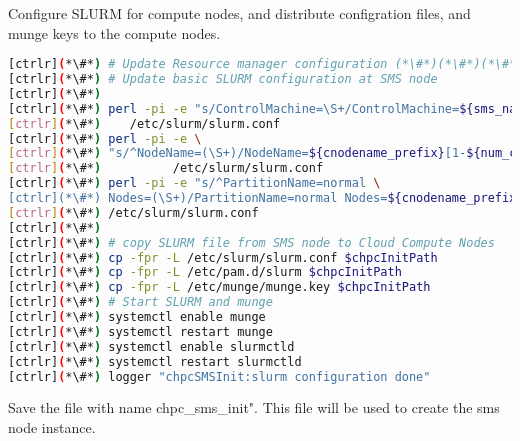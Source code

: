 
	Configure SLURM for compute nodes, and distribute configration files, and munge keys to the compute nodes.



\begin{lstlisting}[language=bash,keywords={}]
[ctrlr](*\#*) # Update Resource manager configuration (*\#*)(*\#*)(*\#*)
[ctrlr](*\#*) # Update basic SLURM configuration at SMS node
[ctrlr](*\#*)
[ctrlr](*\#*) perl -pi -e "s/ControlMachine=\S+/ControlMachine=${sms_name}/" \
[ctrlr](*\#*)    /etc/slurm/slurm.conf
[ctrlr](*\#*) perl -pi -e \
[ctrlr](*\#*) "s/^NodeName=(\S+)/NodeName=${cnodename_prefix}[1-${num_ccomputes}]/" \
[ctrlr](*\#*)          /etc/slurm/slurm.conf
[ctrlr](*\#*) perl -pi -e "s/^PartitionName=normal \
[ctrlr](*\#*) Nodes=(\S+)/PartitionName=normal Nodes=${cnodename_prefix}[1-${num_ccomputes}]/" \
[ctrlr](*\#*) /etc/slurm/slurm.conf
[ctrlr](*\#*)
[ctrlr](*\#*) # copy SLURM file from SMS node to Cloud Compute Nodes
[ctrlr](*\#*) cp -fpr -L /etc/slurm/slurm.conf $chpcInitPath
[ctrlr](*\#*) cp -fpr -L /etc/pam.d/slurm $chpcInitPath
[ctrlr](*\#*) cp -fpr -L /etc/munge/munge.key $chpcInitPath
[ctrlr](*\#*) # Start SLURM and munge 
[ctrlr](*\#*) systemctl enable munge
[ctrlr](*\#*) systemctl restart munge
[ctrlr](*\#*) systemctl enable slurmctld
[ctrlr](*\#*) systemctl restart slurmctld
[ctrlr](*\#*) logger "chpcSMSInit:slurm configuration done"
\end{lstlisting} 


	Save the file with name chpc\_sms\_init". This file will be used to create the sms node instance.

